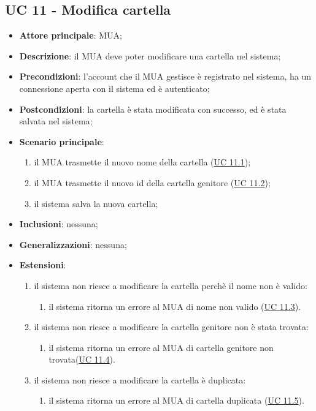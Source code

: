 \subsection{UC 11 - Modifica cartella} \label{sec:UC11}
\begin{itemize}
    \item \textbf{Attore principale}: MUA;
    \item \textbf{Descrizione}: il MUA deve poter modificare una cartella nel sistema;
    \item \textbf{Precondizioni}: l’account che il MUA gestisce è registrato nel sistema, ha un connessione aperta con il sistema ed è autenticato;
    \item \textbf{Postcondizioni}: la cartella è stata modificata con successo, ed è stata salvata nel sistema;
    \item \textbf{Scenario principale}:
        \begin{enumerate}
            \item il MUA trasmette il nuovo nome della cartella (\hyperref[sec:UC11.1]{UC 11.1});
            \item il MUA trasmette il nuovo id della cartella genitore (\hyperref[sec:UC11.2]{UC 11.2});
            \item il sistema salva la nuova cartella;
        \end{enumerate}
    \item \textbf{Inclusioni}: nessuna;
    \item \textbf{Generalizzazioni}: nessuna;
    \item \textbf{Estensioni}: 
    \begin{enumerate}[label=\alph*.]
        \item il sistema non riesce a modificare la cartella perchè il nome non è valido:
        \begin{enumerate}[label=\arabic*.]
            \item il sistema ritorna un errore al MUA di nome non valido (\hyperref[sec:UC11.3]{UC 11.3}).
        \end{enumerate}
        \item il sistema non riesce a modificare la cartella genitore non è stata trovata:
        \begin{enumerate}[label=\arabic*.]
            \item il sistema ritorna un errore al MUA di cartella genitore non trovata(\hyperref[sec:UC11.4]{UC 11.4}).
        \end{enumerate}
        \item il sistema non riesce a modificare la cartella è duplicata:
        \begin{enumerate}[label=\arabic*.]
            \item il sistema ritorna un errore al MUA di cartella duplicata (\hyperref[sec:UC11.5]{UC 11.5}).
        \end{enumerate}
    \end{enumerate}
\end{itemize}

